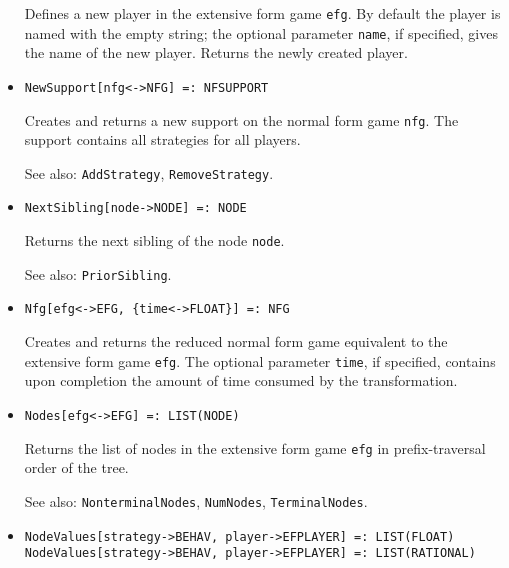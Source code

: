 \begin{itemize}
\bd
Defines a new player in the extensive form game \verb+efg+.
By default the player is named with the empty string; the optional parameter
\verb+name+, if specified, gives the name of the new player.  Returns the
newly created player.
\ed

\item
\protect \large \begin{verbatim}
NewSupport[nfg<->NFG] =: NFSUPPORT
\end{verbatim}\normalsize

\bd
Creates and returns a new support on the normal form
game \verb+nfg+.  The support contains all strategies for all players.
\item
[See also:] {\tt AddStrategy}, {\tt RemoveStrategy}.
\ed

\item
\protect \large \begin{verbatim}
NextSibling[node->NODE] =: NODE
\end{verbatim}\normalsize

\bd
Returns the next sibling of the node \verb+node+.
\item
[See also:] {\tt PriorSibling}.
\ed

\item
\protect \large \begin{verbatim}
Nfg[efg<->EFG, {time<->FLOAT}] =: NFG
\end{verbatim}\normalsize

\bd
Creates and returns the reduced normal form game equivalent
to the extensive form game \verb+efg+.  The optional parameter \verb+time+,
if specified, contains upon completion the amount of time consumed by
the transformation.
\ed

\item
\protect \large \begin{verbatim} 
Nodes[efg<->EFG] =: LIST(NODE)
\end{verbatim}\normalsize

\bd
Returns the list of nodes in the extensive form game
\verb+efg+ in prefix-traversal order of the tree.
\item
[See also:] {\tt NonterminalNodes}, {\tt NumNodes}, {\tt TerminalNodes}.
\ed

\item
\protect \large \begin{verbatim}
NodeValues[strategy->BEHAV, player->EFPLAYER] =: LIST(FLOAT)
NodeValues[strategy->BEHAV, player->EFPLAYER] =: LIST(RATIONAL)
\end{verbatim}\normalsize


\end{itemize}
